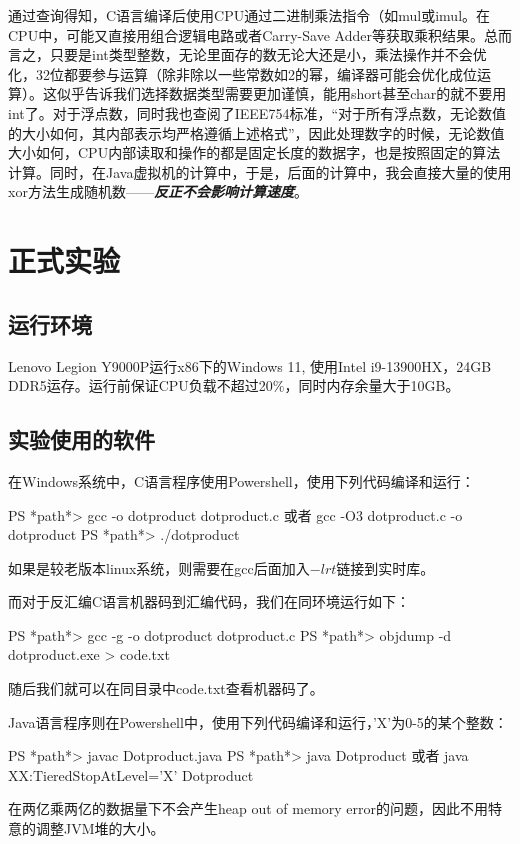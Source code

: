 \documentclass[11pt]{article}
\begin{document}
通过查询得知，​C语言编译后使用CPU通过二进制乘法指令（如mul或imul。在CPU中，可能又直接用组合逻辑电路或者Carry-Save Adder等获取乘积结果。总而言之，只要是int类型整数，无论里面存的数无论大还是小，乘法操作并不会优化，32位都要参与运算（除非除以一些常数如2的幂，编译器可能会优化成位运算）。这似乎告诉我们选择数据类型需要更加谨慎，能用short甚至char的就不要用int了。对于浮点数，同时我也查阅了IEEE754标准，“对于所有浮点数，无论数值的大小如何，其内部表示均严格遵循上述格式”，因此处理数字的时候，无论数值大小如何，CPU内部读取和操作的都是固定长度的数据字，也是按照固定的算法计算。同时，在Java虚拟机的计算中，于是，后面的计算中，我会直接大量的使用xor方法生成随机数——\textbf{\textit{反正不会影响计算速度}}。


\section{正式实验}
\subsection{运行环境}
Lenovo Legion Y9000P运行x86下的Windows 11, 使用Intel i9-13900HX，24GB DDR5运存。运行前保证CPU负载不超过20$\%$，同时内存余量大于10GB。

\subsection{实验使用的软件}
在Windows系统中，C语言程序使用Powershell，使用下列代码编译和运行：
\begin{commandline}
PS *path*> gcc -o dotproduct dotproduct.c
        或者 gcc -O3 dotproduct.c -o dotproduct
PS *path*> ./dotproduct
\end{commandline}
如果是较老版本linux系统，则需要在gcc后面加入$-lrt$链接到实时库。


而对于反汇编C语言机器码到汇编代码，我们在同环境运行如下：
\begin{commandline}
PS *path*> gcc -g -o dotproduct dotproduct.c
PS *path*> objdump -d dotproduct.exe > code.txt
\end{commandline}
随后我们就可以在同目录中code.txt查看机器码了。


Java语言程序则在Powershell中，使用下列代码编译和运行，'X'为0-5的某个整数：
\begin{commandline}
PS *path*> javac Dotproduct.java
PS *path*> java Dotproduct
        或者 java XX:TieredStopAtLevel='X' Dotproduct
\end{commandline}

在两亿乘两亿的数据量下不会产生heap out of memory error的问题，因此不用特意的调整JVM堆的大小。
\end{document}
